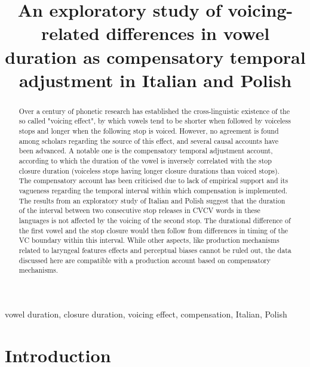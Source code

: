 \documentclass[charis]{glossa}
\title[An exploratory study of voicing-related differences in vowel duration]{An exploratory study of voicing-related differences in vowel duration as
compensatory temporal adjustment in Italian and Polish}
\author[]{
    \spauthor{Stefano Coretta\\
  \institute{The University of Manchester}\\
  \small{Oxford Road, Manchester M13 9PL stefano.coretta@manchester.ac.uk}
  }%
  }
\begin{document}
\sffamily
\maketitle


\begin{keywords}
  vowel duration, closure duration, voicing effect, compensation, Italian,
  Polish
\end{keywords}


\rmfamily

\begin{abstract}
  Over a century of phonetic research has established the cross-linguistic existence of the so called "voicing effect", by which vowels tend to be shorter when followed by voiceless stops and longer when the following stop is voiced.
  However, no agreement is found among scholars regarding the source of this effect, and several causal accounts have been advanced.
  A notable one is the compensatory temporal adjustment account, according to which the duration of the vowel is inversely correlated with the stop closure duration (voiceless stops having longer closure durations than voiced stops).
  The compensatory account has been criticised due to lack of empirical support and its vagueness regarding the temporal interval within which compensation is implemented.
  The results from an exploratory study of Italian and Polish suggest that the duration of the interval between two consecutive stop releases in CVCV words in these languages is not affected by the voicing of the second stop.
  The durational difference of the first vowel and the stop closure would then follow from differences in timing of the VC boundary within this interval.
  While other aspects, like production mechanisms related to laryngeal features effects and perceptual biases cannot be ruled out, the data discussed here are compatible with a production account based on compensatory mechanisms.
\end{abstract}

\hypertarget{introduction}{%
\section{Introduction}\label{introduction}}

\label{s:intro}
\end{document}
